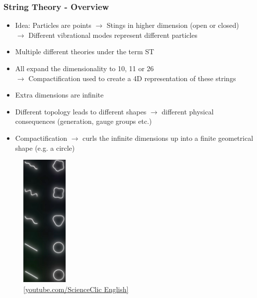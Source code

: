 \documentclass[aspectratio=1610, 9pt]{beamer}
\begin{document}
\begin{frame}
	\frametitle{String Theory - Overview}
	\begin{minipage}{0.7\textwidth}
		\begin{itemize}
			\item Idea: Particles are points $\rightarrow$ Stings in higher dimension (open or closed)\\
			$\rightarrow$ Different vibrational modes represent different particles
			\item Multiple different theories under the term ST
			\item All expand the dimensionality to 10, 11 or 26\\
			$\rightarrow$ Compactification used to create a 4D representation of these strings
			\item Extra dimensions are infinite
			\item Different topology leads to different shapes $\rightarrow$ different physical consequences (generation, gauge groups etc.)
			\item Compactification $\rightarrow$ curls the infinite dimensions up into a finite geometrical shape (e.g. a circle) %
			
		\end{itemize}
	\end{minipage}
	\hfill
	\begin{minipage}{0.25\textwidth}
			\begin{figure}
					\centering
					\includegraphics[width=2.25cm]{images/modes.png}
          \caption{\href{https://www.youtube.com/watch?v=n7cOlBxtKSo}{[youtube.com/ScienceClic English]}}
				\end{figure}
		\end{minipage}
\end{frame}
\end{document}
